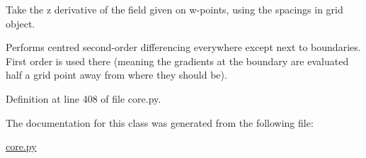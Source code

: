 Take the z derivative of the field given on w-\/points, using the spacings in grid object. 

Performs centred second-\/order differencing everywhere except next to boundaries. First order is used there (meaning the gradients at the boundary are evaluated half a grid point away from where they should be). 

Definition at line 408 of file core.\+py.



The documentation for this class was generated from the following file\+:\begin{DoxyCompactItemize}
\item 
\hyperlink{core_8py}{core.\+py}\end{DoxyCompactItemize}
